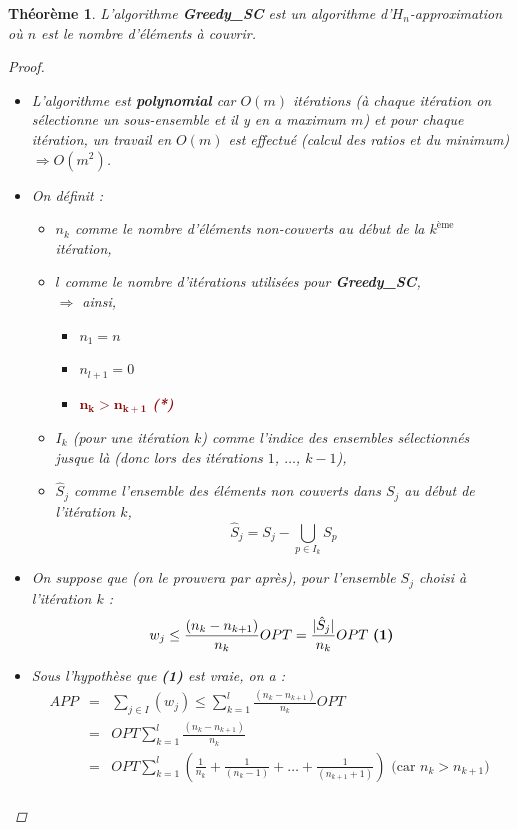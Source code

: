 \documentclass{article}
\newcommand{\rouge}[1]{\textcolor{darkred}{#1}}
\newtheorem{thm}{Th\'eor\`eme}[section]
\newtheorem{proof}{Preuve}[section]
\begin{document}
\begin{sffamily}
\begin{thm}L'algorithme \textbf{Greedy\_SC} est un algorithme d'$H_n$-approximation où $n$ est le nombre d'éléments à couvrir.
\begin{proof}$ $\\
\begin{itemize}
\item L'algorithme est \textbf{polynomial} car $O(m)$ itérations (à chaque itération on sélectionne un sous-ensemble et il y en a maximum
$m$) et pour chaque itération, un travail en $O(m)$ est effectué (calcul des ratios et du minimum) $\Rightarrow O(m^2)$.
\item On définit :
	\begin{itemize}
	\item[$\blacktriangle$] $n_k$ comme le nombre d'éléments non-couverts au début de la $k^{\text{ème}}$ itération,
	\item[$\blacktriangle$] $l$ comme le nombre d'itérations utilisées pour \textbf{Greedy\_SC},\\
	$\Rightarrow$ ainsi,
		\begin{itemize}
		\item[$\vartriangle$] $n_1 = n$
		\item[$\vartriangle$] $n_{l+1} = 0$
		\item[\rouge{$\blacktriangle$}] \rouge{$\mathbf{n_k > n_{k+1}}$ \textbf{(*)}}
		\end{itemize}
	\item[$\blacktriangle$] $I_k$ (pour une itération $k$) comme l'indice des ensembles sélectionnés jusque là (donc lors des itérations
	$1$, $\ldots$, $k-1$),
	\item[$\blacktriangle$] $\hat{S}_j$ comme l'ensemble des éléments non couverts dans $S_j$ au début de l'itération $k$,
	$$\hat{S}_j = S_j - \bigcup_{p\in I_k}{S_p}$$
	\end{itemize}
\item On suppose que (on le prouvera par après), pour l'ensemble $S_j$ choisi à l'itération $k$ :
$$ w_j \leq \frac{(n_k - n_{k+1})}{n_k}OPT = \frac{|\hat{S}_j|}{n_k}OPT\ \text{\textbf{(1)}}$$
\item Sous l'hypothèse que \textbf{(1)} est vraie, on a :
$$ \begin{eqnarray}
APP & = & \sum_{j\in I}(w_j) \leq \sum_{k=1}^l \frac{(n_k -n_{k+1})}{n_k}OPT\\
	& = & OPT \sum_{k=1}^l \frac{(n_k -n_{k+1})}{n_k}\\
	& = & OPT \sum_{k=1}^l \left(\frac{1}{n_k} + \frac{1}{(n_k-1)} +\ldots + \frac{1}{(n_{k+1}+1)}\right)\text{ (car $n_k > n_{k+1}$) }\\

\end{eqnarray}$$
\end{itemize}
\end{proof}
\end{thm}
\end{sffamily}
\end{document}
